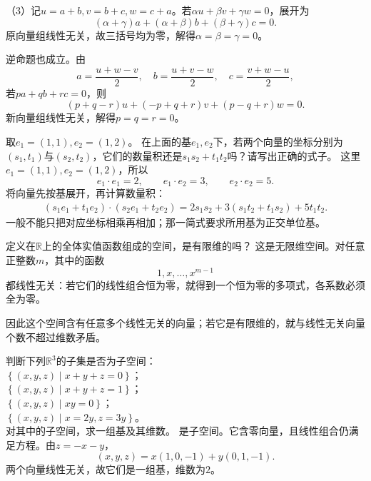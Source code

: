 （3）记\(u=a+b,v=b+c,w=c+a\)。若\(\alpha u+\beta v+\gamma w=0\)，展开为
\[
(\alpha+\gamma)a+(\alpha+\beta)b+(\beta+\gamma)c=0.
\]
原向量组线性无关，故三括号均为零，解得\(\alpha=\beta=\gamma=0\)。

逆命题也成立。由
\[
a=\frac{u+w-v}2,\quad b=\frac{u+v-w}2,\quad c=\frac{v+w-u}2,
\]
若\(pa+qb+rc=0\)，则
\[
(p+q-r)u+(-p+q+r)v+(p-q+r)w=0.
\]
新向量组线性无关，解得\(p=q=r=0\)。


取\(e_1=(1,1),e_2=(1,2)\)。 在上面的基\(e_{1} , e_{2}\)下，若两个向量的坐标分别为\(\left( s_{1} , t_{1} \right)\)与\(\left( s_{2} , t_{2} \right)\)，它们的数量积还是\(s_{1} s_{2} + t_{1} t_{2}\)吗？请写出正确的式子。
\solutionanswer
这里\(e_1=(1,1),e_2=(1,2)\)，所以
\[
e_1\cdot e_1=2,\qquad e_1\cdot e_2=3,\qquad e_2\cdot e_2=5.
\]
将向量先按基展开，再计算数量积：
\[
\begin{aligned}
(s_1e_1+t_1e_2)\cdot(s_2e_1+t_2e_2)
=2s_1s_2+3(s_1t_2+t_1s_2)+5t_1t_2.
\end{aligned}
\]
一般不能只把对应坐标相乘再相加；那一简式要求所用基为正交单位基。


定义在\(\mathbb{R}\)上的全体实值函数组成的空间，是有限维的吗？
\solutionanswer
这是无限维空间。对任意正整数\(m\)，其中的函数
\[
1,x,\ldots,x^{m-1}
\]
都线性无关：若它们的线性组合恒为零，就得到一个恒为零的多项式，各系数必须全为零。

因此这个空间含有任意多个线性无关的向量；若它是有限维的，就与线性无关向量个数不超过维数矛盾。


判断下列\(\mathbb{R}^{3}\)的子集是否为子空间：\\
\(\left\{ \left( x , y , z \right) \mid x + y + z = 0 \right\}\)；\\
\(\left\{ \left( x , y , z \right) \mid x + y + z = 1 \right\}\)；\\
\(\left\{ \left( x , y , z \right) \mid x y = 0 \right\}\)；\\
\(\left\{ \left( x , y , z \right) \mid x = 2 y , z = 3 y \right\}\)。\\
对其中的子空间，求一组基及其维数。
\solutionanswer
{}是子空间。它含零向量，且线性组合仍满足方程。由\(z=-x-y\)，
\[
(x,y,z)=x(1,0,-1)+y(0,1,-1).
\]
两个向量线性无关，故它们是一组基，维数为\(2\)。

